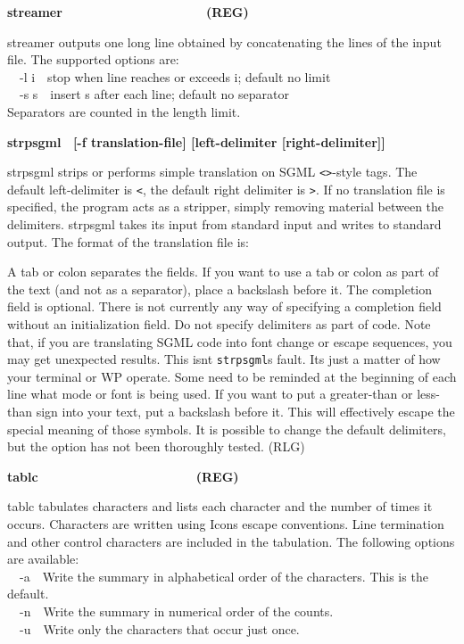 {\sffamily\bfseries
streamer\ \ \ \ \ \ \ \ \ \ \ \ \ \ \ \ \ \ \ \ (REG)}

\textsf{streamer} outputs one long line obtained by concatenating the
lines of the input file. The supported options are:\\
\ \ \textsf{{}-l i}\ \ stop when line reaches or exceeds i; default no
limit\\
\ \ \textsf{{}-s s}\ \ insert s after each line; default no
separator\\
Separators are counted in the length limit.

{\sffamily\bfseries
strpsgml \ \textrm{\textmd{[-f}}\textmd{
}\textrm{\textmd{translation-file]}}\textmd{
}\textrm{\textmd{[left-delimiter}}\textmd{
}\textrm{\textmd{[right-delimiter]]}}}

\textsf{strpsgml} strips or performs simple translation on
SGML \texttt{{\textless}{\textgreater}}{}-style tags. The
default left-delimiter is \texttt{{\textless}}, the default right
delimiter is \texttt{{\textgreater}}. If no translation file is
specified, the program acts as a stripper, simply removing material
between the delimiters. \textsf{strpsgml} takes its input from standard
input and writes to standard output. The format of the translation file
is:


A tab or colon separates the fields. If you want to use a tab or colon
as part of the text (and not as a separator), place a backslash before
it. The completion field is optional. There is not currently any way of
specifying a completion field without an initialization field. Do not
specify delimiters as part of code. Note that, if you are translating
SGML code into font change or escape sequences, you may get unexpected
results. This isn{\textquotesingle}t
\texttt{strpsgml}{\textquotesingle}s fault. It{\textquotesingle}s just
a matter of how your terminal or WP operate. Some need to be
{\textquotedbl}reminded{\textquotedbl} at the beginning of each line
what mode or font is being used. If you want to put a greater-than or
less-than sign into your text, put a backslash before it. This will
effectively {\textquotedbl}escape{\textquotedbl} the special meaning of
those symbols. It is possible to change the default delimiters, but the
option has not been thoroughly tested. (RLG)

{\sffamily\bfseries
tablc\ \ \ \ \ \ \ \ \ \ \ \ \ \ \ \ \ \ \ \ \ \ (REG)}

\textsf{tablc} tabulates characters and lists each character and the
number of times it occurs. Characters are written using
Icon{\textquotesingle}s escape conventions. Line termination and other
control characters are included in the tabulation. The following
options are available:\\
\ \ \textsf{{}-a}\ \ Write the summary in alphabetical order of the
characters. This is the default.\\
\ \ \textsf{{}-n}\ \ Write the summary in numerical order of the
counts.\\
\ \ \textsf{{}-u}\ \ Write only the characters that occur just once.

